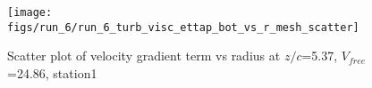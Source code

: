 \begin{figure}[H]
\centering
\texttt{[image: figs/run\_6/run\_6\_turb\_visc\_ettap\_bot\_vs\_r\_mesh\_scatter]}
\caption{Scatter plot of velocity gradient term vs radius at $z/c$=5.37, $V_{free}$=24.86, station1}
\label{fig:run_6_turb_visc_ettap_bot_vs_r_mesh_scatter}
\end{figure}


